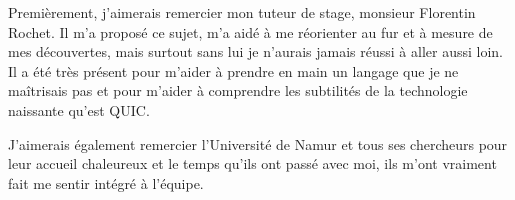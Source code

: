 Premièrement, j'aimerais remercier mon tuteur de stage, monsieur Florentin Rochet. Il m'a proposé ce sujet, m'a aidé à me réorienter au fur et à mesure de mes découvertes, mais surtout sans lui je n'aurais jamais réussi à aller aussi loin.
Il a été très présent pour m'aider à prendre en main un langage que je ne maîtrisais pas et pour m'aider à comprendre les subtilités de la technologie naissante qu'est QUIC.

\vspace{0.5cm}

J'aimerais également remercier l'Université de Namur et tous ses chercheurs pour leur accueil chaleureux et le temps qu'ils ont passé avec moi, ils m'ont vraiment fait me sentir intégré à l'équipe.